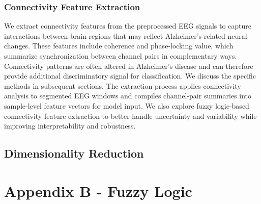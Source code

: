 \documentclass[openany]{book}
\begin{document}
\subsection{Connectivity Feature Extraction}
We extract connectivity features from the preprocessed EEG signals to capture interactions between brain regions that may reflect Alzheimer's-related neural changes. These features include coherence and phase-locking value, which summarize synchronization between channel pairs in complementary ways. Connectivity patterns are often altered in Alzheimer's disease and can therefore provide additional discriminatory signal for classification. We discuss the specific methods in subsequent sections. The extraction process applies connectivity analysis to segmented EEG windows and compiles channel-pair summaries into sample-level feature vectors for model input. We also explore fuzzy logic-based connectivity feature extraction to better handle uncertainty and variability while improving interpretability and robustness.

\section{Dimensionality Reduction}


\chapter*{Appendix B - Fuzzy Logic}
\end{document}
